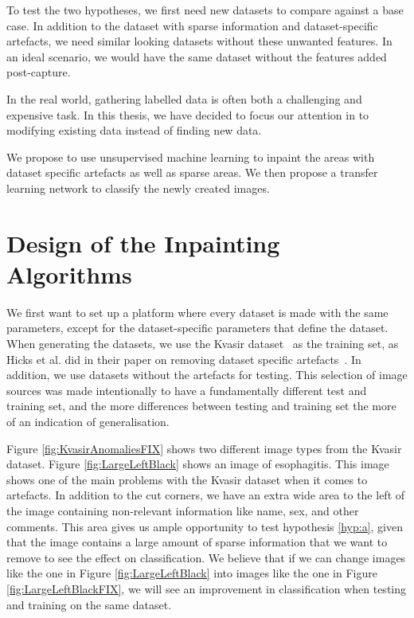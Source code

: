 To test the two hypotheses, we first need new datasets to compare against a base case. In addition to the dataset with sparse information and dataset-specific artefacts, we need similar looking datasets without these unwanted features. In an ideal scenario, we would have the same dataset without the features added post-capture. 

In the real world, gathering labelled data is often both a challenging and expensive task. In this thesis, we have decided to focus our attention in to modifying existing data instead of finding new data. 

We propose to use unsupervised machine learning to inpaint the areas with dataset specific artefacts as well as sparse areas. We then propose a transfer learning network to classify the newly created images. 


\FloatBarrier
\section{Design of the Inpainting Algorithms}

We first want to set up a platform where every dataset is made with the same parameters, except for the dataset-specific parameters that define the dataset. 
When generating the datasets, we use the Kvasir dataset~\cite{Pogorelov:2017:KMI:3083187.3083212} as the training set, as Hicks et al. did in their paper on removing dataset specific artefacts~\cite{25956}. In addition, we use datasets without the artefacts for testing.
This selection of image sources was made intentionally to have a fundamentally different test and training set, and the more differences between testing and training set the more of an indication of generalisation. 

Figure \ref{fig:KvasirAnomaliesFIX} shows two different image types from the Kvasir dataset. 
Figure \ref{fig:LargeLeftBlack} shows an image of esophagitis. This image shows one of the main problems with the Kvasir dataset when it comes to artefacts. In addition to the cut corners, we have an extra wide area to the left of the image containing non-relevant information like name, sex, and other comments. This area gives us ample opportunity to test hypothesis \ref{hyp:a}, given that the image contains a large amount of sparse information that we want to remove to see the effect on classification. 
We believe that if we can change images like the one in Figure \ref{fig:LargeLeftBlack} into images like the one in Figure \ref{fig:LargeLeftBlackFIX}, we will see an improvement in classification when testing and training on the same dataset.

